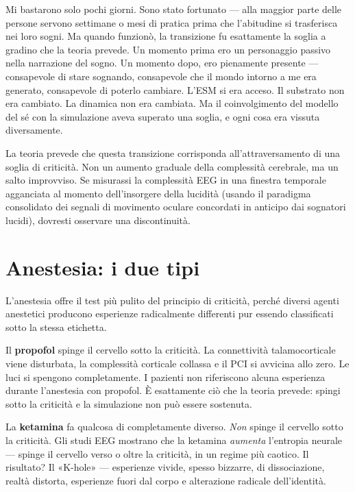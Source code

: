 \documentclass[11pt, twoside, openright]{book}
\begin{document}
Mi bastarono solo pochi giorni. Sono stato fortunato --- alla maggior parte delle persone servono settimane o mesi di pratica prima che l'abitudine si trasferisca nei loro sogni. Ma quando funzionò, la transizione fu esattamente la soglia a gradino che la teoria prevede. Un momento prima ero un personaggio passivo nella narrazione del sogno. Un momento dopo, ero pienamente presente --- consapevole di stare sognando, consapevole che il mondo intorno a me era generato, consapevole di poterlo cambiare. L'ESM si era acceso. Il substrato non era cambiato. La dinamica non era cambiata. Ma il coinvolgimento del modello del sé con la simulazione aveva superato una soglia, e ogni cosa era vissuta diversamente.

La teoria prevede che questa transizione corrisponda all'attraversamento di una soglia di criticità. Non un aumento graduale della complessità cerebrale, ma un salto improvviso. Se misurassi la complessità EEG in una finestra temporale agganciata al momento dell'insorgere della lucidità (usando il paradigma consolidato dei segnali di movimento oculare concordati in anticipo dai sognatori lucidi), dovresti osservare una discontinuità.

\section*{Anestesia: i due tipi}

L'anestesia offre il test più pulito del principio di criticità, perché diversi agenti anestetici producono esperienze radicalmente differenti pur essendo classificati sotto la stessa etichetta.

Il \textbf{propofol} spinge il cervello sotto la criticità. La connettività talamocorticale viene disturbata, la complessità corticale collassa e il PCI si avvicina allo zero. Le luci si spengono completamente. I pazienti non riferiscono alcuna esperienza durante l'anestesia con propofol. È esattamente ciò che la teoria prevede: spingi sotto la criticità e la simulazione non può essere sostenuta.

La \textbf{ketamina} fa qualcosa di completamente diverso. \textit{Non} spinge il cervello sotto la criticità. Gli studi EEG mostrano che la ketamina \textit{aumenta} l'entropia neurale --- spinge il cervello verso o oltre la criticità, in un regime più caotico. Il risultato? Il «K-hole» --- esperienze vivide, spesso bizzarre, di dissociazione, realtà distorta, esperienze fuori dal corpo e alterazione radicale dell'identità.
\end{document}
